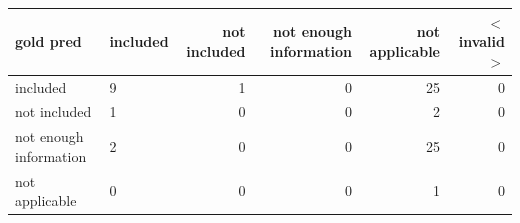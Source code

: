 \begin{tabular}{llrrrr}
\toprule
gold  pred & included & not included & not enough information & not applicable & $<$invalid$>$ \\
\midrule
included & 9 & 1 & 0 & 25 & 0 \\
not included & 1 & 0 & 0 & 2 & 0 \\
not enough information & 2 & 0 & 0 & 25 & 0 \\
not applicable & 0 & 0 & 0 & 1 & 0 \\
\bottomrule
\end{tabular}
